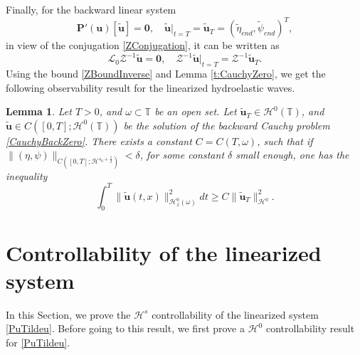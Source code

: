 \documentclass[12pt]{amsart}
\newtheorem{lemma}[theorem]{Lemma}
\theoremstyle{remark}
\theoremstyle{definition}
\numberwithin{equation}{section}
\renewcommand{\H}{{\mathcal H }}
\newcommand{\f}{\frac}
\newcommand{\T}{{\mathbb T}}
\begin{document}
Finally, for the backward linear system 
\begin{equation} \label{CauchyBackZero}
    \mathbf{P}'(\mathbf{u})[\tilde{\mathbf{u}}]= \mathbf{0}, \quad \tilde{\mathbf{u}}|_{t=T} = \tilde{\mathbf{u}}_T =  (\tilde{\eta}_{end}, \tilde{\psi}_{end})^T,
\end{equation}
in view of the conjugation \eqref{ZConjugation}, it can be written as
\begin{equation*}
\mathcal{L}_0\mathcal{Z}^{-1}\tilde{\mathbf{u}}=\mathbf{0},\quad \mathcal{Z}^{-1}\tilde{\mathbf{u}}|_{t=T} = \mathcal{Z}^{-1}\tilde{\mathbf{u}}_{T}.
\end{equation*}
Using the bound \eqref{ZBoundInverse} and Lemma \ref{t:CauchyZero}, we get the following observability result for the linearized hydroelastic waves.
\begin{lemma} \label{t:ObserveZero}
Let $T>0$, and $\omega \subset \T$ be an open set.
Let $\tilde{\mathbf{u}}_T \in \H^0(\T)$, and $\tilde{\mathbf{u}} \in C([0,T]; \H^0(\T))$ be the solution of the backward Cauchy problem \eqref{CauchyBackZero}.
There exists a constant $C= C(T,\omega)$, such that if $\| (\eta, \psi)\|_{C([0,T]; \H^{s_0 +\f52})}< \delta$, for some constant $\delta$ small enough, one has the inequality  
\begin{equation}\label{ObserveZero}
    \int_0^T \|\tilde{\mathbf{u}}(t,x)\|_{\H^0_x(\omega)}^2 dt \geq C\| \tilde{\mathbf{u}}_{T}\|_{\H^0}^2.
\end{equation}
\end{lemma}

\section{Controllability of the linearized system} \label{s:Control}
In this Section, we prove the  $\H^s$ controllability of the linearized system \eqref{PuTildeu}.
Before going to this result, we first prove a $\H^0$ controllability result for \eqref{PuTildeu}.
\end{document}
